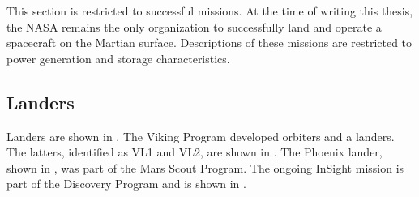 
This section is restricted to successful missions. At the time of writing this thesis, the \ac{NASA} remains the only organization to successfully land and operate a spacecraft on the Martian surface. Descriptions of these missions are restricted to power generation and storage characteristics.

\subsection{Landers}
\label{sec:StateOfTheArt:PastAndOngoingMissions:Landers}

Landers are shown in . The Viking Program developed orbiters and a landers. The latters, identified as \ac{VL1} and \ac{VL2}, are shown in . The Phoenix lander, shown in , was part of the Mars Scout Program. The ongoing \ac{InSight} mission is part of the Discovery Program and is shown in .


